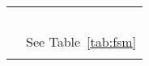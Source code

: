 \begin{longtable}{p{}p{}}
	& \multicolumn{1}{c}{\textbf{~\citet{Yan2008}}} \\ 
    \specialcell{} & See Table~\ref{tab:fsm} \\
	
    \hline
     \label{tab:fpm}
    \end{longtable}%
